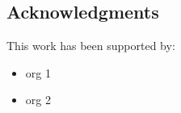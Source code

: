\subsection*{Acknowledgments}
\label{sec:ack}

This work has been supported by:
\begin{itemize}
\item org 1
\item org 2
\end{itemize}

